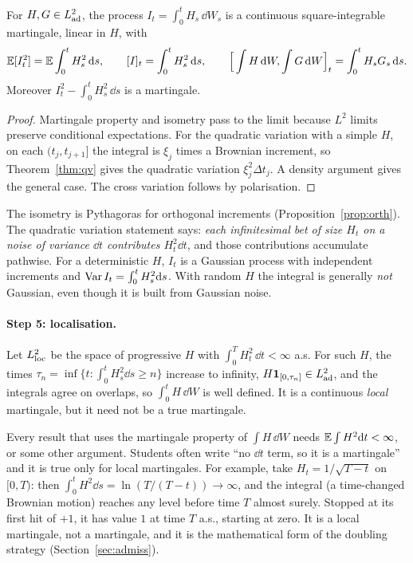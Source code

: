 \begin{theorem}\label{thm:itoprops}
For $H,G\in L^2_{\rm ad}$, the process $I_t=\int_0^tH_s\,\dd W_s$ is a continuous square-integrable martingale, linear in $H$, with
\[
\mathbb{E}[I_t^2]=\mathbb{E}\int_0^tH_s^2\,\mathrm{d} s,\qquad [I]_t=\int_0^tH_s^2\,\mathrm{d} s,\qquad \Big[\int H\,\mathrm{d} W,\int G\,\mathrm{d} W\Big]_t=\int_0^tH_sG_s\,\mathrm{d} s.
\]
Moreover $I_t^2-\int_0^tH_s^2\,\dd s$ is a martingale.
\end{theorem}
\begin{proof}
Martingale property and isometry pass to the limit because $L^2$ limits preserve conditional expectations. For the quadratic variation with a simple $H$, on each $(t_j,t_{j+1}]$ the integral is $\xi_j$ times a Brownian increment, so Theorem~\ref{thm:qv} gives the quadratic variation $\xi_j^2\Delta t_j$. A density argument gives the general case. The cross variation follows by polarisation.
\end{proof}

\begin{intuition}
The isometry is Pythagoras for orthogonal increments (Proposition~\ref{prop:orth}). The quadratic variation statement says: \emph{each infinitesimal bet of size $H_t$ on a noise of variance $\dd t$ contributes $H_t^2\dd t$}, and those contributions accumulate pathwise. For a deterministic $H$, $I_t$ is a Gaussian process with independent increments and $\operatorname{Var} I_t=\int_0^tH_s^2\mathrm{d} s$. With random $H$ the integral is generally \emph{not} Gaussian, even though it is built from Gaussian noise.
\end{intuition}

\paragraph{Step 5: localisation.} Let $L^2_{\rm loc}$ be the space of progressive $H$ with $\int_0^TH_t^2\,\dd t<\infty$ a.s. For such $H$, the times $\tau_n=\inf\{t:\int_0^tH_s^2\dd s\ge n\}$ increase to infinity, $H\mathbf{1}_{[0,\tau_n]}\in L^2_{\rm ad}$, and the integrals agree on overlaps, so $\int_0^tH\,\dd W$ is well defined. It is a continuous \emph{local} martingale, but it need not be a true martingale.

\begin{pitfall}
Every result that uses the martingale property of $\int H\,\dd W$ needs $\mathbb{E}\int H^2\mathrm{d} t<\infty$, or some other argument. Students often write ``no $\dd t$ term, so it is a martingale'' and it is true only for local martingales. For example, take $H_t=1/\sqrt{T-t}$ on $[0,T)$: then $\int_0^tH^2\dd s=\ln(T/(T-t))\to\infty$, and the integral (a time-changed Brownian motion) reaches any level before time $T$ almost surely. Stopped at its first hit of $+1$, it has value $1$ at time $T$ a.s., starting at zero. It is a local martingale, not a martingale, and it is the mathematical form of the doubling strategy (Section~\ref{sec:admiss}).
\end{pitfall}

